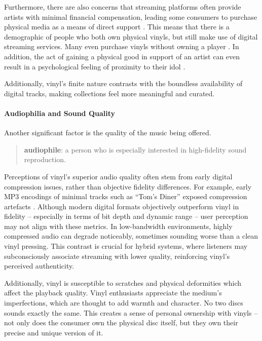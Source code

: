                 Furthermore, there are also concerns that streaming platforms often provide artists with minimal financial compensation, leading some consumers to purchase physical media as a means of direct support \cite{historyandrevivalofvinyls}. This means that there is a demographic of people who both own physical vinyls, but still make use of digital streaming services. Many even purchase vinyls without owning a player \cite{Trapp2023}. In addition, the act of gaining a physical good in support of an artist can even result in a psychological feeling of proximity to their idol \cite{historyandrevivalofvinyls}.
                
                Additionally, vinyl's finite nature contrasts with the boundless availability of digital tracks, making collections feel more meaningful and curated.
    
            \paragraph{Audiophilia and Sound Quality}
    
                Another significant factor is the quality of the music being offered.
    
                \begin{quote}
                    \textbf{audiophile}: a person who is especially interested in high-fidelity sound reproduction. \cite{audiophile2025}
                \end{quote}
    
                Perceptions of vinyl's superior audio quality often stem from early digital compression issues, rather than objective fidelity differences. For example, early MP3 encodings of minimal tracks such as ``Tom's Diner'' exposed compression artefacts \cite{maguire2014ghost}. Although modern digital formats objectively outperform vinyl in fidelity -- especially in terms of bit depth and dynamic range -- user perception may not align with these metrics. In low-bandwidth environments, highly compressed audio can degrade noticeably, sometimes sounding worse than a clean vinyl pressing. This contrast is crucial for hybrid systems, where listeners may subconsciously associate streaming with lower quality, reinforcing vinyl's perceived authenticity.
    
                Additionally, vinyl is susceptible to scratches and physical deformities which affect the playback quality. Vinyl enthusiasts appreciate the medium's imperfections, which are thought to add warmth and character. No two discs sounds exactly the same. This creates a sense of personal ownership with vinyls -- not only does the consumer own the physical disc itself, but they own their precise and unique version of it.
    
